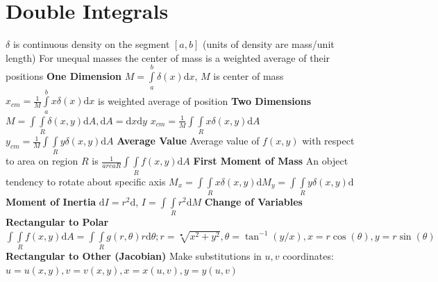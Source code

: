\documentclass[twoside]{article}
\begin{document}
\section{Double Integrals}
\indent $\delta$ is continuous density on the segment $[a,b]$ (units of density are mass/unit length)\newline
For unequal masses the center of mass is a weighted average of their positions\newline
\textbf{One Dimension}\newline
\indent $M = \int\limits_a^b \delta(x)\mathrm{d}x$, $M$ is center of mass\newline
\indent $x_{cm}=\frac{1}{M}\int\limits_a^b x\delta(x)\mathrm{d}x$ is weighted average of position\newline
\textbf{Two Dimensions}\newline
\indent $M = \int\int\limits_R \delta(x,y)\mathrm{d}A, \mathrm{d}A = \mathrm{d}x\mathrm{d}y$\newline
\indent $x_{cm} = \frac{1}{M} \int\int\limits_R x\delta(x,y)\mathrm{d}A$\indent
\indent $y_{cm} = \frac{1}{M} \int\int\limits_R y\delta(x,y)\mathrm{d}A$\newline
\textbf{Average Value}\newline
\indent Average value of $f(x,y)$ with respect to area on region $R$ is
$\frac{1}{area R} \int\int\limits_R f(x,y)\mathrm{d}A$\newline
\textbf{First Moment of Mass}\newline
An object tendency to rotate about specific axis\newline
\indent$M_{x} = \int\int\limits_R x \delta(x,y) \mathrm{d}$\indent$M_{y} = \int\int\limits_R y \delta(x,y) \mathrm{d}$\newline
\textbf{Moment of Inertia}\newline
\indent $\mathrm{d}I = r^2\mathrm{d}$, $I = \int\int\limits_R r^2 \mathrm{d}M$\newline
\textbf{Change of Variables}\newline
\indent\textbf{Rectangular to Polar}\newline
\indent\indent $\int\int\limits_R f(x,y)\mathrm{d}A = \int\int\limits_R g(r,\theta)r\mathrm{d}\theta; r=\sqrt[•]{x^2+y^2}, \theta=\tan^{-1}(y/x), x=r\cos(\theta), y=r\sin(\theta)$\newline
\indent\textbf{Rectangular to Other (Jacobian)}\newline
\indent\indent Make substitutions in $u,v$ coordinates: $u = u(x,y), v = v(x,y), x = x(u,v), y = y(u,v)$\newline
\end{document}

